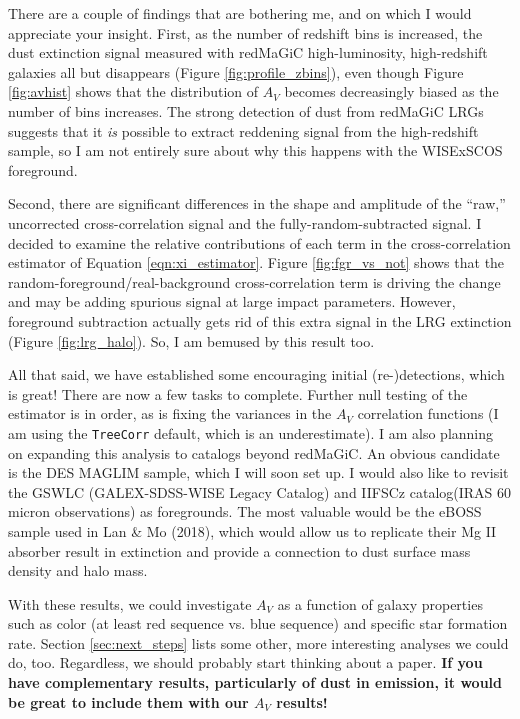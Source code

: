 \documentclass[11pt, oneside]{article}   	%
\begin{document}
There are a couple of findings that are bothering me, and on which I would appreciate your insight. First, as the number of redshift bins is increased, the dust extinction signal measured with redMaGiC high-luminosity, high-redshift galaxies all but disappears (Figure \ref{fig:profile_zbins}), even though Figure \ref{fig:avhist} shows that the distribution of $A_V$ becomes decreasingly biased as the number of bins increases. The strong detection of dust from redMaGiC LRGs suggests that it \textit{is} possible to extract reddening signal from the high-redshift sample, so I am not entirely sure about why this happens with the WISExSCOS foreground. 

Second, there are significant differences in the shape and amplitude of the ``raw,'' uncorrected cross-correlation signal and the fully-random-subtracted signal. I decided to examine the relative contributions of each term in the cross-correlation estimator of Equation \ref{eqn:xi_estimator}. Figure \ref{fig:fgr_vs_not} shows that the random-foreground/real-background cross-correlation term is driving the change and may be adding spurious signal at large impact parameters. However, foreground subtraction actually gets rid of this extra signal in the LRG extinction (Figure \ref{fig:lrg_halo}). So, I am bemused by this result too. 

All that said, we have established some encouraging initial (re-)detections, which is great! There are now a few tasks to complete. Further null testing of the estimator is in order, as is fixing the variances in the $A_V$ correlation functions (I am using the \texttt{TreeCorr} default, which is an underestimate). I am also planning on expanding this analysis to catalogs beyond redMaGiC. An obvious candidate is the DES MAGLIM sample, which I will soon set up. I would also like to revisit the GSWLC (GALEX-SDSS-WISE Legacy Catalog) and IIFSCz catalog(IRAS 60 micron observations) as foregrounds. The most valuable would be the eBOSS sample used in Lan \& Mo (2018), which would allow us to replicate their Mg II absorber result in extinction and provide a connection to dust surface mass density and halo mass. 

With these results, we could investigate $A_V$ as a function of galaxy properties such as color (at least red sequence vs. blue sequence) and specific star formation rate. Section \ref{sec:next_steps} lists some other, more interesting analyses we could do, too. Regardless, we should probably start thinking about a paper. \textbf{If you have complementary results, particularly of dust in emission, it would be great to include them with our $A_V$ results!}
 
\end{document}
